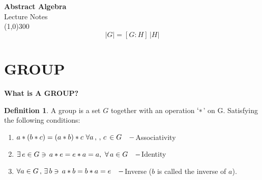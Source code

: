 \documentclass[11pt,a4paper]{article}
\theoremstyle{definition}
\newtheorem{defn}[thm]{Definition}
\begin{document}
\begin{titlepage}
\thispagestyle{empty}
\begin{center}
\vspace*{3cm}
{\Huge\bfseries Abstract Algebra}\\[1.2cm]
{\large Lecture Notes}\\[2.5cm]
\line(1,0){300}\\[1.5cm]
$$\left|G\right| = \left[G:H\right]\,\left|H\right|$$
\end{center}
\end{titlepage}

\tableofcontents
\thispagestyle{empty}
\clearpage
\setcounter{page}{1}

















\section{GROUP}

\textbf{What is A GROUP?}\\



\begin{defn}
A group is a set $G$ together with an operation $`*$' on G. Satisfying the following conditions:
\begin{enumerate}
\item $a*(b*c) = (a*b)*c\,\, \forall a\, , \, , \, c\,\in G\,\hspace{0.3cm} -$Associativity
\item $\exists\, e\in G\ni \, a*e = e*a = a, \,\, \forall\, a\in G\,\hspace{0.3cm} -$Identity
\item $\forall a\in G\, ,\, \exists\, b\ni \, a*b = b*a = e\, \hspace{0.3cm}-$Inverse ($b$ is called the inverse of $a$).\\\\
\end{enumerate}
\end{defn}
\end{document}
